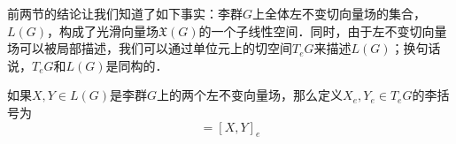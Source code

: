 前两节的结论让我们知道了如下事实：李群$G$上全体左不变切向量场的集合，$L(G)$，构成了光滑向量场$\mathfrak{X}(G)$的一个子线性空间．同时，由于左不变切向量场可以被局部描述，我们可以通过单位元上的切空间$T_eG$来描述$L(G)$；换句话说，$T_eG$和$L(G)$是同构的．

\begin{definition}{}
如果$X, Y\in L(G)$是李群$G$上的两个左不变向量场，那么定义$X_e, Y_e\in T_eG$的李括号为
\begin{equation}
[X_e, Y_e]=[X, Y]_e
\end{equation}
\end{definition}














